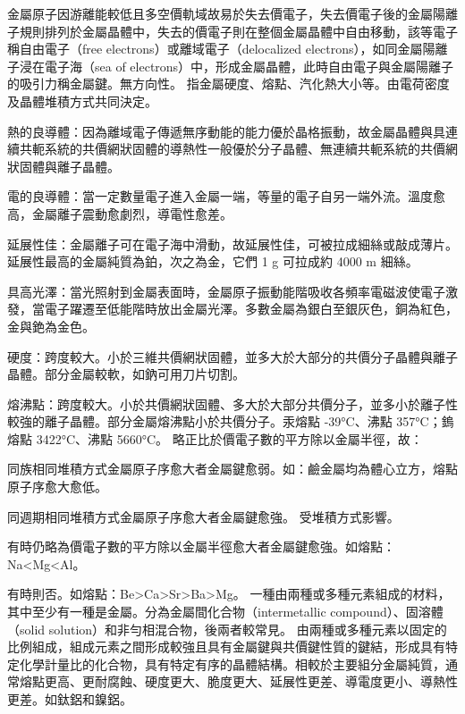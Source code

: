 \documentclass[a4paper,12pt]{report}
\begin{document}
金屬原子因游離能較低且多空價軌域故易於失去價電子，失去價電子後的金屬陽離子規則排列於金屬晶體中，失去的價電子則在整個金屬晶體中自由移動，該等電子稱自由電子（free electrons）或離域電子（delocalized electrons），如同金屬陽離子浸在電子海（sea of electrons）中，形成金屬晶體，此時自由電子與金屬陽離子的吸引力稱金屬鍵。無方向性。
指金屬硬度、熔點、汽化熱大小等。由電荷密度及晶體堆積方式共同決定。
\bit
\item 熱的良導體：因為離域電子傳遞無序動能的能力優於晶格振動，故金屬晶體與具連續共軛系統的共價網狀固體的導熱性一般優於分子晶體、無連續共軛系統的共價網狀固體與離子晶體。
\item 電的良導體：當一定數量電子進入金屬一端，等量的電子自另一端外流。溫度愈高，金屬離子震動愈劇烈，導電性愈差。
\item 延展性佳：金屬離子可在電子海中滑動，故延展性佳，可被拉成細絲或敲成薄片。延展性最高的金屬純質為鉑，次之為金，它們 1 g 可拉成約 4000 m 細絲。
\item 具高光澤：當光照射到金屬表面時，金屬原子振動能階吸收各頻率電磁波使電子激發，當電子躍遷至低能階時放出金屬光澤。多數金屬為銀白至銀灰色，銅為紅色，金與銫為金色。
\item 硬度：跨度較大。小於三維共價網狀固體，並多大於大部分的共價分子晶體與離子晶體。部分金屬較軟，如鈉可用刀片切割。
\item 熔沸點：跨度較大。小於共價網狀固體、多大於大部分共價分子，並多小於離子性較強的離子晶體。部分金屬熔沸點小於共價分子。汞熔點 -39°C、沸點 357°C；鎢熔點 3422°C、沸點 5660°C。
\eit
{}
略正比於價電子數的平方除以金屬半徑，故：
\bit
\item 同族相同堆積方式金屬原子序愈大者金屬鍵愈弱。如：鹼金屬均為體心立方，熔點原子序愈大愈低。
\item 同週期相同堆積方式金屬原子序愈大者金屬鍵愈強。
\eit
{}
受堆積方式影響。
\bit
\item 有時仍略為價電子數的平方除以金屬半徑愈大者金屬鍵愈強。如熔點：Na<Mg<Al。
\item 有時則否。如熔點：Be>Ca>Sr>Ba>Mg。
\eit
{}
一種由兩種或多種元素組成的材料，其中至少有一種是金屬。分為金屬間化合物（intermetallic compound）、固溶體（solid solution）和非勻相混合物，後兩者較常見。
由兩種或多種元素以固定的比例組成，組成元素之間形成較強且具有金屬鍵與共價鍵性質的鍵結，形成具有特定化學計量比的化合物，具有特定有序的晶體結構。相較於主要組分金屬純質，通常熔點更高、更耐腐蝕、硬度更大、脆度更大、延展性更差、導電度更小、導熱性更差。如鈦鋁和鎳鋁。
\end{document}
